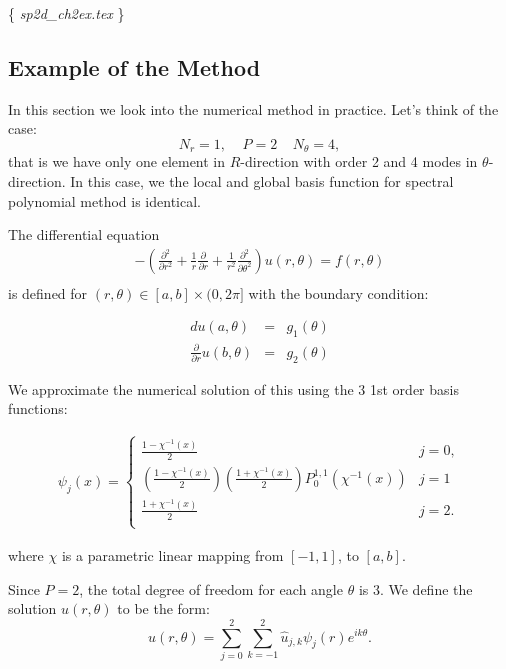 

\{ {\it  sp2d\_ch2ex.tex} \}

\subsection{Example of the Method}

In this section we look into the numerical method in practice.
Let's think of the case:
\begin{equation}
N_r = 1, \;\;\;\; P = 2 \;\;\;\; N_\theta = 4,
\end{equation}
that is we have only one element in $R$-direction with order 2 and 4 modes in $\theta$-direction. In this case, we the local and global basis function for spectral polynomial method is identical.

The differential equation
\begin{eqnarray}
- \left(\frac{\partial^2}{\partial r^2} + \frac{1}{r} \frac{\partial}{\partial r} + \frac{1}{r^2}\frac{\partial^2}{\partial \theta^2} \right) u(r,\theta) = f(r, \theta)  \\
\end{eqnarray}
is defined for  $(r, \theta) \in [a, b] \times (0, 2\pi]$ with the boundary condition:

\begin{eqnarray}
du(a,\theta) &=& g_1(\theta) \\
\frac{\partial}{\partial r} u(b,\theta) &=& g_2(\theta)
\end{eqnarray}

We approximate the numerical solution of this using the 3 1st
order basis functions:

\begin{eqnarray}
\psi_j(x) = \left \{
    \begin{array}{ll}
    \frac{1-\chi^{-1}(x)}{2} & j=0, \\
    (\frac{1-\chi^{-1}(x)}{2})(\frac{1+\chi^{-1}(x)}{2})P_0^{1,1}(\chi^{-1}(x)) & j=1 \\
    \frac{1+\chi^{-1}(x)}{2} & j=2. \\
    \end{array} \right.
 \end{eqnarray}

where $\chi$ is a parametric linear mapping from $[-1, 1]$, to $[a, b]$.

Since $P=2$, the total degree of freedom for each angle $\theta$ is $3$.
We define the solution $u(r,\theta)$ to be the form:
\begin{equation}
u(r, \theta) = \sum_{j=0}^2 \sum_{k=-1}^2 \hat u_{j,k} \psi_j(r) e^{ik\theta}.
\end{equation}

